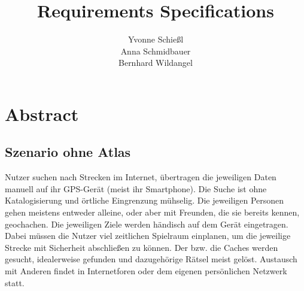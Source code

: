 \documentclass[a4paper, 12pt]{article}
\title{\textbf{Requirements Specifications}}
\author{ Yvonne Schießl \\
		Anna Schmidbauer\\
		Bernhard Wildangel}
\date{}
\begin{document}
\maketitle
\tableofcontents
\newpage
\section{Abstract}


\subsection{Szenario ohne Atlas}
Nutzer suchen nach Strecken im Internet, übertragen die jeweiligen Daten manuell auf ihr GPS-Gerät (meist ihr Smartphone). Die Suche ist ohne Katalogisierung und örtliche Eingrenzung mühselig. Die jeweiligen Personen gehen meistens entweder alleine, oder aber mit Freunden, die sie bereits kennen, geochachen. Die jeweiligen Ziele werden händisch auf dem Gerät eingetragen. Dabei müssen die Nutzer viel zeitlichen Spielraum einplanen, um die jeweilige Strecke mit Sicherheit abschließen zu können. Der bzw. die Caches werden gesucht, idealerweise gefunden und dazugehörige Rätsel meist gelöst.
Austausch mit Anderen findet in Internetforen oder dem eigenen persönlichen Netzwerk statt.
\end{document}
